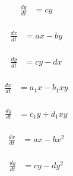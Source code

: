 \documentclass[12pt]{article}
\begin{document}
\begin{itemize}
    \begin{equation}
      \begin{split}
        \frac{dy}{dt} & = cy \\
      \end{split}
      \label{8}
    \end{equation}

    \begin{equation}
      \begin{split}
        \frac{dx}{dt} & = ax-by \\
      \end{split}
      \label{9}
    \end{equation}

    \begin{equation}
      \begin{split}
        \frac{dy}{dt} & = cy-dx \\
      \end{split}
      \label{10}
    \end{equation}

    \begin{equation}
      \begin{split}
        \frac{dx}{dt} & = a_1x-b_1xy \\
      \end{split}
      \label{11}
    \end{equation}

    \begin{equation}
      \begin{split}
        \frac{dy}{dt} & = c_1y+d_1xy \\
      \end{split}
      \label{12}
    \end{equation}

    \begin{equation}
      \begin{split}
        \frac{dx}{dt} & = ax-bx^2 \\
      \end{split}
      \label{13}
    \end{equation}

    \begin{equation}
      \begin{split}
        \frac{dy}{dt} & = cy-dy^2 \\
      \end{split}
      \label{14}
    \end{equation}


\end{itemize}
\end{document}
